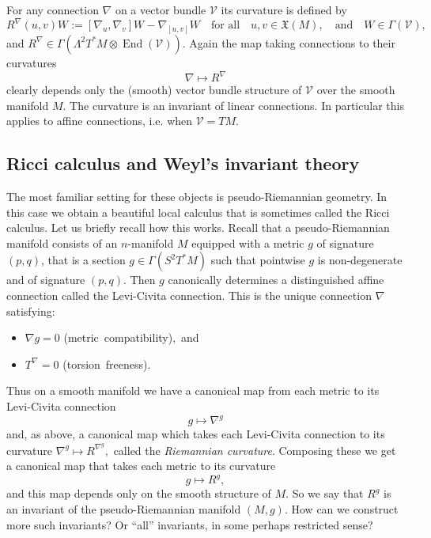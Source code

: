 \documentclass[a4paper,12pt]{amsart}
\def\cV{\mathcal{V}}
\newcommand{\End}{\operatorname{End}}
\theoremstyle{remark}
\begin{document}
For any connection $\nabla$ on a vector bundle $\cV$ its
curvature is defined by
$$
R^{\nabla}(u,v)W:= [\nabla_u,\nabla_v] W-\nabla_{[u,v]}W \quad \mbox{for all} \quad u,v\in \mathfrak{X}(M), \quad \mbox{and} \quad W\in \Gamma(\cV),
$$
and $R^{\nabla}\in \Gamma(\Lambda^2 T^*M\otimes \End(\cV))$.
Again the map taking connections to their curvatures 
$$
\nabla \mapsto R^{\nabla} 
$$ clearly depends only the (smooth) vector bundle structure of $\cV$
over the smooth manifold $M$. The curvature is an invariant of linear
connections. In particular this applies to affine connections,
i.e. when $\cV=TM$.


\smallskip


\subsection{Ricci calculus and Weyl's invariant theory} 
The most familiar setting for these objects is pseudo-Riemannian
geometry. In this case we obtain a beautiful local calculus that is
sometimes called the Ricci calculus. Let us briefly recall how this
works. Recall that a pseudo-Riemannian manifold consists of an
$n$-manifold $M$ equipped with a metric $g$ of signature $(p,q)$, that is a section 
$g\in \Gamma(S^2T^* M)$  such that pointwise $g$ is non-degenerate and of signature $(p,q)$.
Then $g$ canonically determines a distinguished affine connection called 
the Levi-Civita connection. This is the unique 
connection $\nabla$ satisfying:
\begin{itemize}[itemsep=4pt]
\item $\nabla g =0$ \;\;\;\;\mbox{(metric compatibility), and}
\item  $T^{\nabla}=0$ \;\;\;\;\mbox{(torsion freeness).} 
\end{itemize}

\noindent Thus on a smooth manifold we have a canonical map from each metric to
its Levi-Civita connection
$$
g\mapsto \nabla^g
$$ and, as above, a canonical map which takes each Levi-Civita
connection to its curvature $ \nabla^g\mapsto R^{\nabla^g}, $ called
the {\em Riemannian curvature}. Composing these we get a canonical map that
takes each metric to its curvature
$$
g\longmapsto R^g, 
$$ 
and this map depends only on the smooth structure of $M$. So we say
that $R^g$ is an invariant of the pseudo-Riemannian manifold $(M,g)$. How
can we construct more such invariants? Or ``all'' invariants, in some
perhaps restricted sense?
\end{document}
